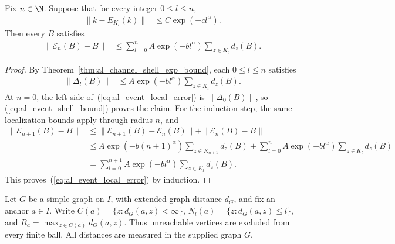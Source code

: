 \begin{theorem}
    \label{thm:al_local_channel_event_error}
    \leanok
    Fix $n\in\N$. Suppose that for every integer $0\le l\le n$,
    \begin{align}
        \|k-E_{K_l}(k)\|&\le C\exp(-cl^\alpha).
        \label{eq:al_event_localization_error}
    \end{align}
    Then every $B$ satisfies
    \begin{align}
        \|\mathcal E_n(B)-B\|
         &\le\sum_{l=0}^n A\exp(-bl^\alpha)
             \sum_{z\in K_l}d_z(B).
        \label{eq:al_event_local_error}
    \end{align}
\end{theorem}
\begin{proof}
    \leanok
    By Theorem~\ref{thm:al_channel_shell_exp_bound}, each
    $0\le l\le n$ satisfies
    \begin{align}
        \|\Delta_l(B)\|
         &\le A\exp(-bl^\alpha)\sum_{z\in K_l}d_z(B).
        \label{eq:al_event_shell_bound}
    \end{align}
    At $n=0$, the left side of~(\ref{eq:al_event_local_error})
    is $\|\Delta_0(B)\|$, so
    (\ref{eq:al_event_shell_bound}) proves the claim.
    For the induction step, the same localization bounds apply
    through radius $n$, and
    \begin{align}
        \|\mathcal E_{n+1}(B)-B\|
         &\le\|\mathcal E_{n+1}(B)-\mathcal E_n(B)\|
             +\|\mathcal E_n(B)-B\|\nonumber\\
         &\le A\exp(-b(n+1)^\alpha)
             \sum_{z\in K_{n+1}}d_z(B)
             +\sum_{l=0}^n A\exp(-bl^\alpha)
               \sum_{z\in K_l}d_z(B)\nonumber\\
         &=\sum_{l=0}^{n+1}A\exp(-bl^\alpha)
             \sum_{z\in K_l}d_z(B).
        \label{eq:al_event_induction}
    \end{align}
    This proves~(\ref{eq:al_event_local_error}) by induction.
\end{proof}

Let $G$ be a simple graph on $I$, with extended graph distance
$d_G$, and fix an anchor $a\in I$. Write
$C(a)=\{z:d_G(a,z)<\infty\}$,
$N_l(a)=\{z:d_G(a,z)\le l\}$, and
$R_a=\max_{z\in C(a)}d_G(a,z)$.
Thus unreachable vertices are excluded from every finite ball.
All distances are measured in the supplied graph $G$.

